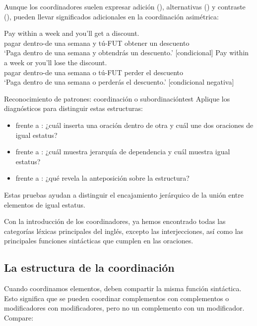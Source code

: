 Aunque los coordinadores suelen expresar adición (), alternativas () y contraste (), pueden llevar significados adicionales en la coordinación asimétrica:

\ea \label{ex:coord-meaning-es}
    \ea \gll Pay within a week and you'll get a discount.\\
        pagar dentro-de una semana y tú-FUT obtener un descuento\\
    \glt `Paga dentro de una semana y obtendrás un descuento.' [condicional]
    \ex \gll Pay within a week or you'll lose the discount.\\
        pagar dentro-de una semana o tú-FUT perder el descuento\\
    \glt `Paga dentro de una semana o perderás el descuento.' [condicional negativa]
    \z
\z

\begin{tblsframedsymbol}{Reconocimiento de patrones: coordinación o subordinación}{test}
Aplique los diagnósticos para distinguir estas estructuras:
\begin{itemize}[noitemsep, leftmargin=*]
    \item {} frente a : ¿cuál inserta una oración dentro de otra y cuál une dos oraciones de igual estatus?
    \item {} frente a : ¿cuál muestra jerarquía de dependencia y cuál muestra igual estatus?
    \item {} frente a : ¿qué revela la anteposición sobre la estructura?
\end{itemize}
Estas pruebas ayudan a distinguir el encajamiento jerárquico de la unión entre elementos de igual estatus.
\end{tblsframedsymbol}

Con la introducción de los coordinadores, ya hemos encontrado todas las categorías léxicas principales del inglés, excepto las interjecciones, así como las principales funciones sintácticas que cumplen en las oraciones.

\subsection{La estructura de la coordinación}

Cuando coordinamos elementos, deben compartir la misma función sintáctica. Esto significa que se pueden coordinar complementos con complementos o modificadores con modificadores, pero no un complemento con un modificador. Compare:

